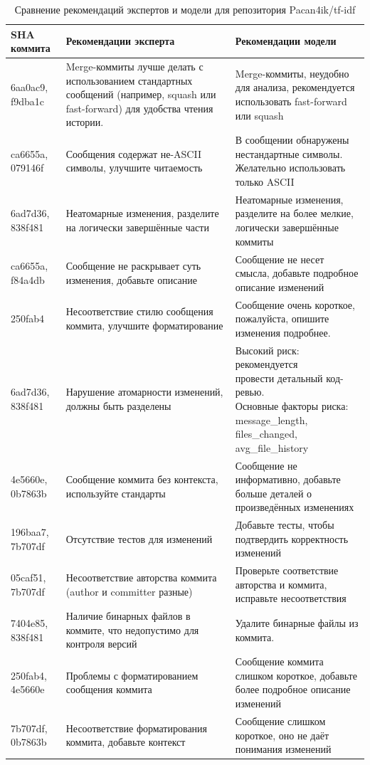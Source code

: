 \begin{table}[h!]
	\centering
	\caption{Сравнение рекомендаций экспертов и модели для репозитория Pacan4ik/tf-idf}
	\label{tab:expert_vs_model_recommendations}
	\small
	\begin{tabularx}{\textwidth}{|p{2.5cm}|X|X|}
		\hline
		\textbf{SHA коммита} & \textbf{Рекомендации эксперта} & \textbf{Рекомендации модели} \\
		\hline
		6aa0ac9, f9dba1c & Merge-коммиты лучше делать с использованием стандартных сообщений (например, squash или fast-forward) для удобства чтения истории. & Merge-коммиты, неудобно для анализа, рекомендуется использовать fast-forward или squash \\
		\hline
		ca6655a, 079146f & Сообщения содержат не-ASCII символы, улучшите читаемость & В сообщении обнаружены нестандартные символы. Желательно использовать только ASCII \\
		\hline
		6ad7d36, 838f481 & Неатомарные изменения, разделите на логически завершённые части & Неатомарные изменения, разделите на более мелкие, логически завершённые коммиты \\
		\hline
		ca6655a, f84a4db & Сообщение не раскрывает суть изменения, добавьте описание & Сообщение не несет смысла, добавьте подробное описание изменений \\
		\hline
		250fab4 & Несоответствие стилю сообщения коммита, улучшите форматирование & Сообщение очень короткое, пожалуйста, опишите изменения подробнее.\\
		\hline
		6ad7d36, 838f481 & Нарушение атомарности изменений, должны быть разделены & \makecell[tl]{Высокий риск: рекомендуется\\ провести детальный код-ревью.\\Основные факторы риска:\\ message\_length, files\_changed,\\ avg\_file\_history} \\
		\hline
		4e5660e, 0b7863b & Сообщение коммита без контекста, используйте стандарты & Сообщение не информативно, добавьте больше деталей о произведённых изменениях \\
		\hline
		196baa7, 7b707df & Отсутствие тестов для изменений & Добавьте тесты, чтобы подтвердить корректность изменений \\
		\hline
		05caf51, 7b707df & Несоответствие авторства коммита (author и committer разные) & Проверьте соответствие авторства и коммита, исправьте несоответствия \\
		\hline
		7404e85, 838f481 & Наличие бинарных файлов в коммите, что недопустимо для контроля версий & Удалите бинарные файлы из коммита. \\
		\hline
		250fab4, 4e5660e & Проблемы с форматированием сообщения коммита & Сообщение коммита слишком короткое, добавьте более подробное описание изменений \\
		\hline
		7b707df, 0b7863b & Несоответствие форматирования коммита, добавьте контекст & Сообщение слишком короткое, оно не даёт понимания изменений \\
		\hline
	\end{tabularx}
\end{table}

